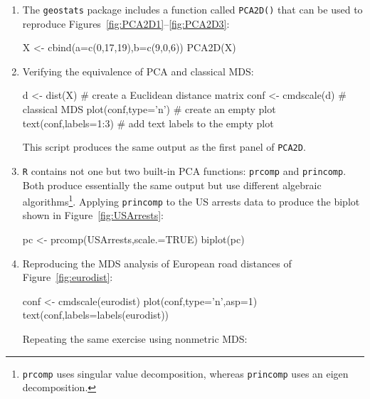 \begin{enumerate}

\item The \texttt{geostats} package includes a function called
  \texttt{PCA2D()} that can be used to reproduce
  Figures~\ref{fig:PCA2D1}--\ref{fig:PCA2D3}:

\begin{script}
X <- cbind(a=c(0,17,19),b=c(9,0,6))
PCA2D(X)
\end{script}

\item Verifying the equivalence of PCA and classical MDS:

\begin{script}[firstnumber=3]
d <- dist(X)           # create a Euclidean distance matrix
conf <- cmdscale(d)    # classical MDS
plot(conf,type='n')    # create an empty plot
text(conf,labels=1:3)  # add text labels to the empty plot
\end{script}

This script produces the same output as the first panel of
\texttt{PCA2D}.

\item \texttt{R} contains not one but two built-in PCA functions:
  \texttt{prcomp} and \texttt{princomp}. Both produce essentially the
  same output but use different algebraic
  algorithms\footnote{\texttt{prcomp} uses singular value
  decomposition, whereas \texttt{princomp} uses an eigen
  decomposition.}. Applying \texttt{princomp} to the US arrests data
  to produce the biplot shown in Figure~\ref{fig:USArrests}:

\begin{script}
pc <- prcomp(USArrests,scale.=TRUE)
biplot(pc)
\end{script}

\item Reproducing the MDS analysis of European road distances of
  Figure~\ref{fig:eurodist}:

\begin{script}
conf <- cmdscale(eurodist)
plot(conf,type='n',asp=1)
text(conf,labels=labels(eurodist))
\end{script}

Repeating the same exercise using nonmetric MDS:



\end{enumerate}
